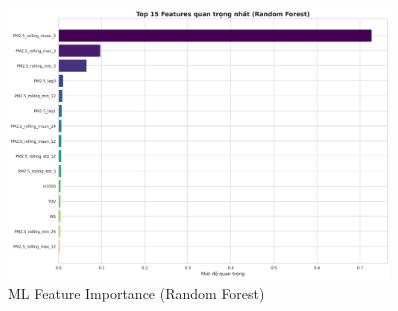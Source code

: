 \documentclass[12pt,a4paper]{article}
\begin{document}
\begin{figure}[H]
\centering
\includegraphics[width=0.9\textwidth]{results_comb_PM25_Hanoi_2018_sm_20251011_121424/20251011_121424_ml_feature_importance.png}
\caption{ML Feature Importance (Random Forest)}
\end{figure}
\end{document}
